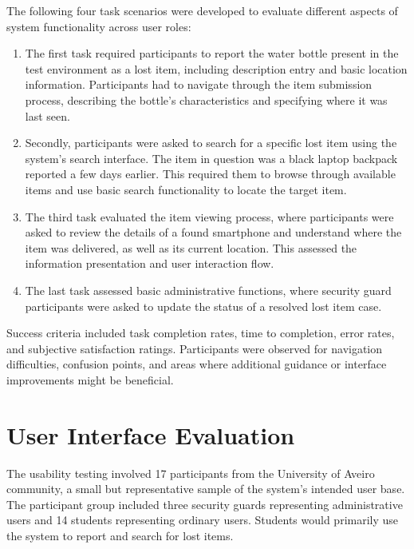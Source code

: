 The following four task scenarios were developed to evaluate different aspects of system functionality across user roles:

\begin{enumerate}
    \item The first task required participants to report the water bottle present in the test environment as a lost item, including description entry and basic location information. Participants had to navigate through the item submission process, describing the bottle's characteristics and specifying where it was last seen.
    \item Secondly, participants were asked to search for a specific lost item using the system's search interface. The item in question was a black laptop backpack reported a few days earlier. This required them to browse through available items and use basic search functionality to locate the target item.
    \item The third task evaluated the item viewing process, where participants were asked to review the details of a found smartphone and understand where the item was delivered, as well as its current location. This assessed the information presentation and user interaction flow.
    \item The last task assessed basic administrative functions, where security guard participants were asked to update the status of a resolved lost item case.
\end{enumerate}


Success criteria included task completion rates, time to completion, error rates, and subjective satisfaction ratings. Participants were observed for navigation difficulties, confusion points, and areas where additional guidance or interface improvements might be beneficial.


\section{User Interface Evaluation} \label{section:ui_evaluation}

The usability testing involved 17 participants from the University of Aveiro community, a small but representative sample of the system's intended user base. The participant group included three security guards representing administrative users and 14 students representing ordinary users. Students would primarily use the system to report and search for lost items.

